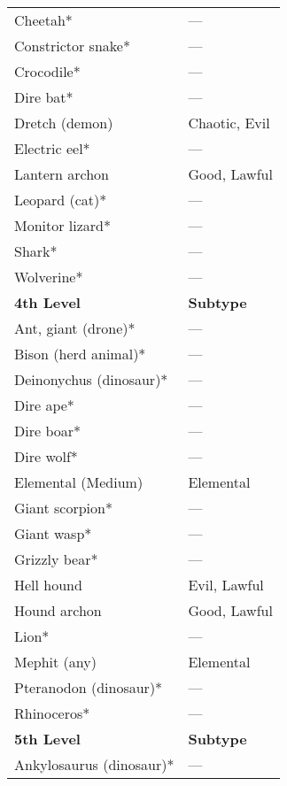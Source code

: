 \begin{xtabular}{ll}
Cheetah*                  & ---                \\
Constrictor snake*        & ---                \\
Crocodile*                & ---                \\
Dire bat*                 & ---                \\
Dretch (demon)            & Chaotic, Evil    \\
Electric eel*             & ---                \\
Lantern archon            & Good, Lawful     \\
Leopard (cat)*            & ---                \\
Monitor lizard*           & ---                \\
Shark*                    & ---                \\
Wolverine*                & ---                \\
\textbf{4th Level}        & \textbf{Subtype} \\
Ant, giant (drone)*       & ---                \\
Bison (herd animal)*      & ---                \\
Deinonychus (dinosaur)*   & ---                \\
Dire ape*                 & ---                \\
Dire boar*                & ---                \\
Dire wolf*                & ---                \\
Elemental (Medium)        & Elemental        \\
Giant scorpion*           & ---                \\
Giant wasp*               & ---                \\
Grizzly bear*             & ---                \\
Hell hound                & Evil, Lawful     \\
Hound archon              & Good, Lawful     \\
Lion*                     & ---                \\
Mephit (any)              & Elemental        \\
Pteranodon (dinosaur)*    & ---                \\
Rhinoceros*               & ---                \\
\textbf{5th Level}        & \textbf{Subtype} \\
Ankylosaurus (dinosaur)*  & ---                \\

\end{xtabular}
